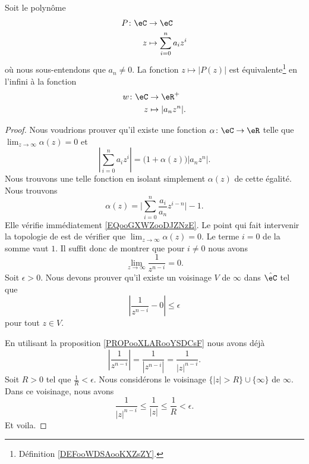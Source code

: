 \begin{proposition}     \label{PROPooPWVWooGuftxZ}
    Soit le polynôme
    \begin{equation}
        \begin{aligned}
            P\colon \eC&\to \eC \\
            z&\mapsto \sum_{i=0}^na_iz^i 
        \end{aligned}
    \end{equation}
    où nous sous-entendons que \( a_n\neq 0\). La fonction \( z\mapsto | P(z) |\) est équivalente\footnote{Définition \ref{DEFooWDSAooKXZsZY}.} en l'infini à la fonction
    \begin{equation}
        \begin{aligned}
            w\colon \eC&\to \eR^+ \\
            z&\mapsto | a_nz^n |. 
        \end{aligned}
    \end{equation}
\end{proposition}

\begin{proof}
    Nous voudrions prouver qu'il existe une fonction \( \alpha\colon \eC\to \eR\) telle que \( \lim_{z\to \infty} \alpha(z)=0\) et
    \begin{equation}        \label{EQooGXWZooDJZNzE}
        | \sum_{i=0}^na_iz^i |=\big( 1+\alpha(z) \big)| a_nz^n |.
    \end{equation}
    Nous trouvons une telle fonction en isolant simplement \( \alpha(z)\) de cette égalité. Nous trouvons
    \begin{equation}
        \alpha(z)=\big| \sum_{i=0}^n\frac{ a_i }{ a_n }z^{i-n} \big|-1.
    \end{equation}
    Elle vérifie immédiatement \eqref{EQooGXWZooDJZNzE}. Le point qui fait intervenir la topologie de  est de vérifier que \( \lim_{z\to \infty} \alpha(z)=0\). Le terme \( i=0\) de la somme vaut \( 1\). Il suffit donc de montrer que pour \( i\neq 0\) nous avons
    \begin{equation}
        \lim_{z\to \infty} \frac{1}{ z^{n-i} }=0.
    \end{equation}
    Soit \( \epsilon>0\). Nous devons prouver qu'il existe un voisinage \( V\) de \( \infty\) dans \( \hat \eC\) tel que
    \begin{equation}
        | \frac{1}{ z^{n-i} }-0 |\leq \epsilon
    \end{equation}
    pour tout \( z\in V\).
    
    En utilisant la proposition \ref{PROPooXLARooYSDCsF} nous avons déjà
    \begin{equation}
        | \frac{1}{ z^{n-i} } |=\frac{1}{ | z^{n-i} | }=\frac{1}{ | z |^{n-i} }.
    \end{equation}
    Soit \( R>0\) tel que \( \frac{1}{ R }<\epsilon\). Nous considérons le voisinage \( \{ | z |>R \}\cup \{ \infty \}\) de \( \infty\). Dans ce voisinage, nous avons
    \begin{equation}
        \frac{1}{ | z |^{n-i} }\leq \frac{1}{ | z | }\leq \frac{1}{ R }<\epsilon.
    \end{equation}
    Et voila.
\end{proof}

